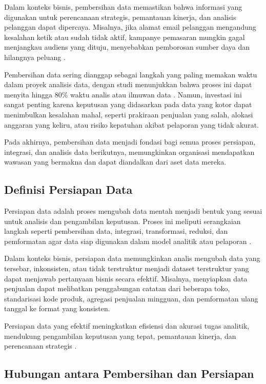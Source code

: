 Dalam konteks bisnis, pembersihan data memastikan bahwa informasi yang digunakan untuk perencanaan strategis, pemantauan kinerja, dan analisis pelanggan dapat dipercaya. Misalnya, jika alamat email pelanggan mengandung kesalahan ketik atau sudah tidak aktif, kampanye pemasaran mungkin gagal menjangkau audiens yang dituju, menyebabkan pemborosan sumber daya dan hilangnya peluang \cite{rahm2000dataquality}.

Pembersihan data sering dianggap sebagai langkah yang paling memakan waktu dalam proyek analisis data, dengan studi menunjukkan bahwa proses ini dapat menyita hingga 80\% waktu analis atau ilmuwan data \cite{dasu2003exploratory}. Namun, investasi ini sangat penting karena keputusan yang didasarkan pada data yang kotor dapat menimbulkan kesalahan mahal, seperti prakiraan penjualan yang salah, alokasi anggaran yang keliru, atau risiko kepatuhan akibat pelaporan yang tidak akurat.

Pada akhirnya, pembersihan data menjadi fondasi bagi semua proses persiapan, integrasi, dan analisis data berikutnya, memungkinkan organisasi mendapatkan wawasan yang bermakna dan dapat diandalkan dari aset data mereka.

\subsection{Definisi Persiapan Data}

Persiapan data adalah proses mengubah data mentah menjadi bentuk yang sesuai untuk analisis dan pengambilan keputusan. Proses ini meliputi serangkaian langkah seperti pembersihan data, integrasi, transformasi, reduksi, dan pemformatan agar data siap digunakan dalam model analitik atau pelaporan \cite{pyle1999data}.

Dalam konteks bisnis, persiapan data memungkinkan analis mengubah data yang tersebar, inkonsisten, atau tidak terstruktur menjadi dataset terstruktur yang dapat menjawab pertanyaan bisnis secara efektif. Misalnya, menyiapkan data penjualan dapat melibatkan penggabungan catatan dari beberapa toko, standarisasi kode produk, agregasi penjualan mingguan, dan pemformatan ulang tanggal ke format yang konsisten.

Persiapan data yang efektif meningkatkan efisiensi dan akurasi tugas analitik, mendukung pengambilan keputusan yang tepat, pemantauan kinerja, dan perencanaan strategis \cite{zeller2014data}.

\subsection{Hubungan antara Pembersihan dan Persiapan}

